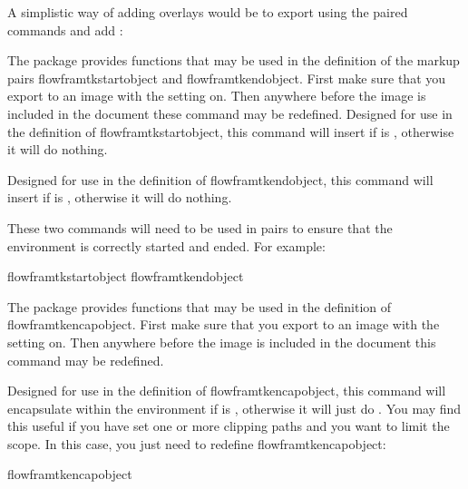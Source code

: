 \documentclass[fontsize=12pt]{scrbook}
\begin{document}
A simplistic way of adding overlays would be to export using the
paired commands and add :
\begin{codebox}
\end{codebox}

The  package provides functions that may be
used in the definition of the markup pairs \gls{flowframtkstartobject}
and \gls{flowframtkendobject}.  First make
sure that you export to an image with the  setting
on.  Then anywhere before the image is included in the document
these command may be redefined.
Designed for use in the definition of
\gls{flowframtkstartobject}, this command will insert
 if  is ,
otherwise it will do nothing.

Designed for use in the definition of
\gls{flowframtkendobject}, this command will insert
 if  is ,
otherwise it will do nothing.

These two commands will need to be used in pairs to ensure
that the  environment is correctly started and ended.
For example:
\begin{codebox} 
\gls{flowframtkstartobject}
\gls{flowframtkendobject}
\end{codebox} 

The  package provides functions that may be
used in the definition of \gls{flowframtkencapobject}.  First make
sure that you export to an image with the  setting
on.  Then anywhere before the image is included in the document this
command may be redefined.

Designed for use in the definition of \gls{flowframtkencapobject},
this command will encapsulate  within the
 environment if  is ,
otherwise it will just do . You may find this useful if
you have set one or more clipping paths and you want to limit the
scope.
In this case, you just need to redefine \gls{flowframtkencapobject}:
\begin{codebox} 
\gls{flowframtkencapobject}
\end{codebox} 
\end{document}
